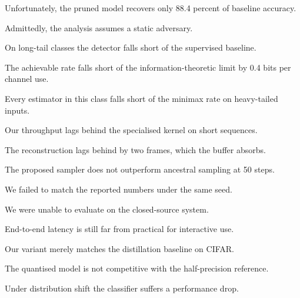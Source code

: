 
Unfortunately, the pruned model recovers only 88.4 percent of baseline accuracy.

Admittedly, the analysis assumes a static adversary.

On long-tail classes the detector falls short of the supervised baseline.

The achievable rate falls short of the information-theoretic limit by 0.4 bits per channel use.

Every estimator in this class falls short of the minimax rate on heavy-tailed inputs.

Our throughput lags behind the specialised kernel on short sequences.

The reconstruction lags behind by two frames, which the buffer absorbs.

The proposed sampler does not outperform ancestral sampling at 50 steps.

We failed to match the reported numbers under the same seed.

We were unable to evaluate on the closed-source system.

End-to-end latency is still far from practical for interactive use.

Our variant merely matches the distillation baseline on CIFAR.

The quantised model is not competitive with the half-precision reference.

Under distribution shift the classifier suffers a performance drop.

